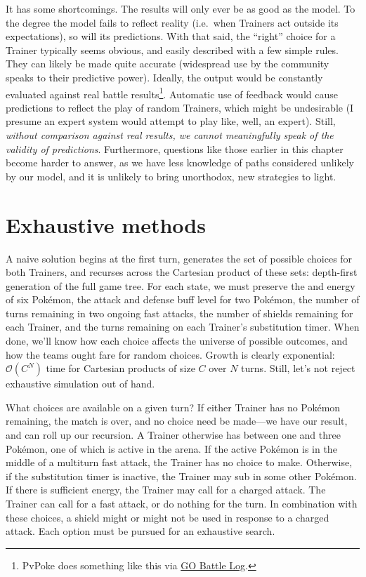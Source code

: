 It has some shortcomings.
The results will only ever be as good as the model.
To the degree the model fails to reflect reality (i.e.\ when Trainers act outside
 its expectations), so will its predictions.
With that said, the ``right'' choice for a Trainer typically seems obvious,
 and easily described with a few simple rules.
They can likely be made quite accurate (widespread use by the community speaks to their predictive power).
Ideally, the output would be constantly evaluated against real battle results\footnote{PvPoke does something like this via \href{https://gobattlelog.com}{GO Battle Log}.}.
Automatic use of feedback would cause predictions to reflect the play of random Trainers,
 which might be undesirable (I presume an expert system would attempt to play like, well, an expert).
Still, \textit{without comparison against real results, we cannot meaningfully speak of the validity of predictions}.
Furthermore, questions like those earlier in this chapter become harder to answer,
 as we have less knowledge of paths considered unlikely by our model,
 and it is unlikely to bring unorthodox, new strategies to light.

\section{Exhaustive methods\label{sec:exhaustive}}
A naive solution begins at the first turn, generates the set of possible
  choices for both Trainers, and recurses across the Cartesian product
  of these sets: depth-first generation of the full game tree.
For each state, we must preserve the \HP{} and energy of six Pokémon,
  the attack and defense buff level for two Pokémon,
  the number of turns remaining in two ongoing fast attacks,
  the number of shields remaining for each Trainer,
  and the turns remaining on each Trainer's substitution timer.
When done, we'll know how each choice affects the universe of possible outcomes,
  and how the teams ought fare for random choices.
Growth is clearly exponential: $\mathcal{O}(C^N)$ time for Cartesian products of size $C$ over $N$ turns.
Still, let's not reject exhaustive simulation out of hand.

What choices are available on a given turn?
If either Trainer has no Pokémon remaining, the match is over, and no choice
  need be made---we have our result, and can roll up our recursion.
A Trainer otherwise has between one and three Pokémon, one of which is active
  in the arena.
If the active Pokémon is in the middle of a multiturn fast attack, the
  Trainer has no choice to make.
Otherwise, if the substitution timer is inactive, the Trainer may sub in some other Pokémon.
If there is sufficient energy, the Trainer may call for a charged attack.
The Trainer can call for a fast attack, or do nothing for the turn.
In combination with these choices, a shield might or might not be used in response to a charged attack.
Each option must be pursued for an exhaustive search.

